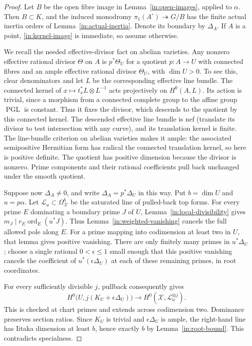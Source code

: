 \begin{proof}
Let \(B\) be the open fibre image in
Lemma~\ref{in:open-images}, applied to \(\alpha\).  Then \(B\subset K\),
and the induced monodromy \(\pi_1(A^\circ)\twoheadrightarrow G/B\)
has the finite actual inertia orders of
Lemma~\ref{in:actual-inertia}.  Denote its boundary by \(\Delta_A\).
If \(A\) is a point, \eqref{in:kernel-image} is immediate, so assume
otherwise.

We recall the needed effective-divisor fact on abelian varieties.
Any nonzero effective rational divisor \(\Theta\) on \(A\) is
\(p^*\Theta_U\) for a quotient \(p:A\to U\) with connected fibres
and an ample effective rational divisor \(\Theta_U\), with
\(\dim U>0\).  To see this, clear denominators and let \(L\) be
the corresponding effective line bundle.  The connected kernel
of \(x\mapsto t_x^*L\otimes L^{-1}\) acts projectively on
\(H^0(A,L)\).  Its action is trivial, since a morphism from a
connected complete group to the affine group \(\operatorname{PGL}\)
is constant.  Thus it fixes the divisor, which descends to the
quotient by this connected kernel.  The descended effective line
bundle is nef (translate its divisor to test intersection with
any curve), and its translation kernel is finite.  The line-bundle
criterion on abelian varieties makes it ample: the associated
semipositive Hermitian form has radical the connected translation
kernel, so here is positive definite.  The quotient has positive
dimension because the divisor is nonzero.  Prime components and
their rational coefficients pull back unchanged under the smooth
quotient.

Suppose now \(\Delta_A\ne0\), and write
\(\Delta_A=p^*\Delta_U\) in this way.  Put \(b=\dim U\) and
\(u=p\alpha\).  Let \(\mathcal L_u\subset\Omega^b_{\mathcal X}\)
be the saturated line of pulled-back top forms.  For every prime
\(E\) dominating a boundary prime \(J\) of \(U\),
Lemma~\ref{in:local-divisibility} gives
\(m_J\mid r_E\operatorname{ord}_E(u^*J)\).  Thus
Lemma~\ref{in:weighted-vanishing} cancels the full allowed pole
along \(E\).  For a prime mapping into codimension at least two
in \(U\), that lemma gives positive vanishing.  There are only
finitely many primes in \(u^*\Delta_U\); choose a single rational
\(0<\epsilon\le1\) small enough that this positive vanishing
cancels the coefficient of \(u^*(\epsilon\Delta_U)\) at each of
these remaining primes, in root coordinates.

For every sufficiently divisible \(j\), pullback consequently gives
\[
 H^0\bigl(U,j(K_U+\epsilon\Delta_U)\bigr)
       \longrightarrow H^0(\mathcal X,\mathcal L_u^{\otimes j}).
\]
This is checked at chart primes and extends across codimension
two.  Dominance preserves section ratios.  Since \(K_U\) is
trivial and \(\epsilon\Delta_U\) is ample, the right-hand line
has Iitaka dimension at least \(b\), hence exactly \(b\) by
Lemma~\ref{in:root-bound}.  This contradicts specialness.


\end{proof}
